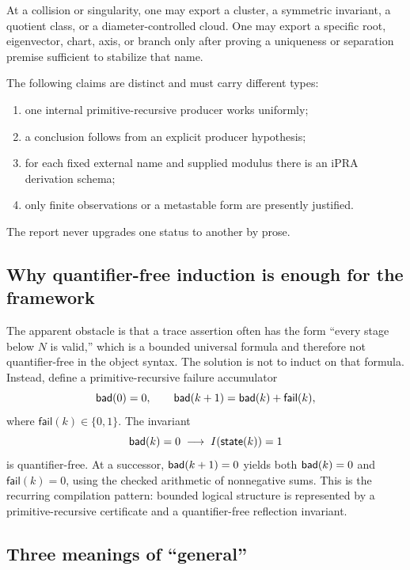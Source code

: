 \begin{principle}
At a collision or singularity, one may export a cluster, a symmetric invariant,
a quotient class, or a diameter-controlled cloud.  One may export a specific
root, eigenvector, chart, axis, or branch only after proving a uniqueness or
separation premise sufficient to stabilize that name.
\end{principle}

\begin{principle}
The following claims are distinct and must carry different types:
\begin{enumerate}[label=(\alph*)]
\item one internal primitive-recursive producer works uniformly;
\item a conclusion follows from an explicit producer hypothesis;
\item for each fixed external name and supplied modulus there is an iPRA
      derivation schema;
\item only finite observations or a metastable form are presently justified.
\end{enumerate}
The report never upgrades one status to another by prose.
\end{principle}

\subsection{Why quantifier-free induction is enough for the framework}

The apparent obstacle is that a trace assertion often has the form
``every stage below \(N\) is valid,'' which is a bounded universal formula and
therefore not quantifier-free in the object syntax.  The solution is not to
induct on that formula.  Instead, define a primitive-recursive failure
accumulator
\[
 \mathsf{bad}(0)=0,
 \qquad
 \mathsf{bad}(k+1)=\mathsf{bad}(k)+\mathsf{fail}(k),
\]
where \(\mathsf{fail}(k)\in\{0,1\}\).  The invariant
\[
 \mathsf{bad}(k)=0\;\longrightarrow\;I(\mathsf{state}(k))=1
\]
is quantifier-free.  At a successor, \(\mathsf{bad}(k+1)=0\) yields both
\(\mathsf{bad}(k)=0\) and \(\mathsf{fail}(k)=0\), using the checked arithmetic of
nonnegative sums.  This is the recurring compilation pattern: bounded logical
structure is represented by a primitive-recursive certificate and a
quantifier-free reflection invariant.

\subsection{Three meanings of ``general''}

